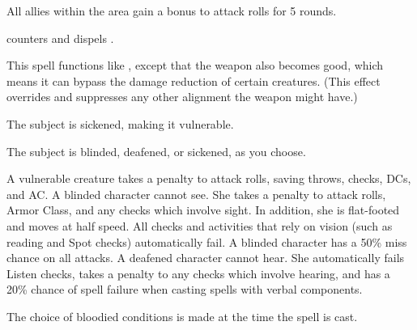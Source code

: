 \begin{spelleffect}
  All allies within the area gain a  bonus to attack rolls for 5 rounds. \bonusscalingdescription
\end{spelleffect}
\begin{spellnotes}
   counters and dispels .
\end{spellnotes}

\begin{spelleffect}
  This spell functions like , except that the weapon also becomes good, which means it can bypass the damage reduction of certain creatures. (This effect overrides and suppresses any other alignment the weapon might have.)
\end{spelleffect}

\begin{spellhealthy}
  The subject is sickened, making it vulnerable.
\end{spellhealthy}
\begin{spellblood}
  The subject is blinded, deafened, or sickened, as you choose.
\end{spellblood}
\begin{spellnotes}
  A vulnerable creature takes a  penalty to attack rolls, saving throws, checks, DCs, and AC. A blinded character cannot see. She takes a  penalty to attack rolls, Armor Class, and any checks which involve sight. In addition, she is flat-footed and moves at half speed. All checks and activities that rely on vision (such as reading and Spot checks) automatically fail. A blinded character has a 50\% miss chance on all attacks. A deafened character cannot hear. She automatically fails Listen checks, takes a  penalty to any checks which involve hearing, and has a 20\% chance of spell failure when casting spells with verbal components.
  
  The choice of bloodied conditions is made at the time the spell is cast.
\end{spellnotes}

